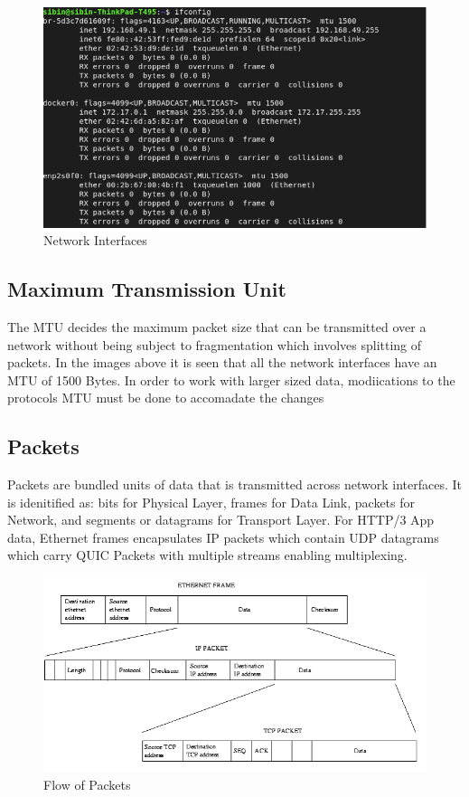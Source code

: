 \begin{figure}[h]
\caption{Network Interfaces}
\centering
\includegraphics[width=1\textwidth]{SOA/NIC.png}
\end{figure}

\subsection{Maximum Transmission Unit}

The MTU decides the maximum packet size that can be transmitted over a network without being subject to fragmentation which involves splitting of packets. In the images above it is seen that all the network interfaces have an MTU of 1500 Bytes. In order to work with larger sized data, modiications to the protocols MTU must be done to accomadate the changes




\subsection{Packets}

Packets are bundled units of data that is transmitted across network interfaces. It is idenitified as: bits  for Physical Layer, frames for Data Link, packets for Network, and segments or datagrams for Transport Layer. For HTTP/3 App data, Ethernet frames encapsulates IP packets which contain UDP datagrams which carry QUIC Packets with multiple streams enabling multiplexing.

\begin{figure}[H]
\caption{Flow of Packets}
\centering
\includegraphics[width=1\textwidth]{SOA/packets.png}
\end{figure}

